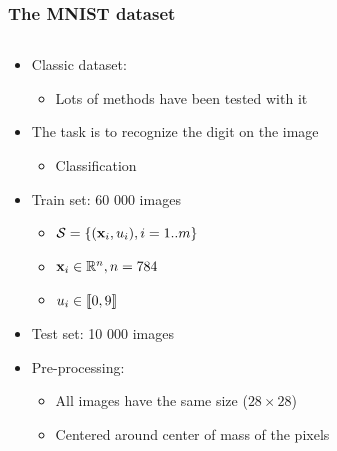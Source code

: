 \begin{frame}

  \frametitle{The MNIST dataset}

  \begin{columns}
    \begin{column}{0.5\textwidth}
      \begin{itemize}
      \item Classic dataset:
        \begin{itemize}
        \item Lots of methods have been tested with it
        \end{itemize}
      \item<2-> The task is to recognize the digit on the image
        \begin{itemize}
          \item Classification
        \end{itemize}
      \item<3-> Train set: 60 000 images
        \begin{itemize}
        \item $\mathcal{S} =
          \left \lbrace {\ensuremath{\left ( {\mathbf{x}_{i}}, {u_{i}} \right )}} , {i=1..m} \right \rbrace$
        \item $\mathbf{x}_i \in \mathbb{R}^{n}, n = 784$
        \item $u_i \in \left \llbracket {0}, {9} \right \rrbracket$
        \end{itemize}
      \item<3-> Test set: 10 000 images
      \item<4-> Pre-processing:
        \begin{itemize}
        \item All images have the same size ($28 \times 28$)
        \item Centered around center of mass of the pixels
        \end{itemize}
      \end{itemize}
    \end{column}

\end{columns}
\end{frame}
